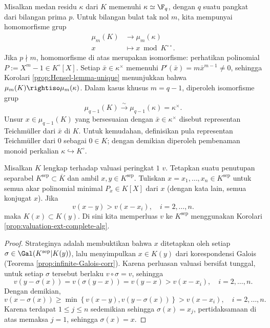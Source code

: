 \begin{example}\label{eg:Teichmuller-rep}
	Misalkan medan residu $\kappa$ dari $K$ memenuhi $\kappa \simeq \F_q$, dengan $q$ suatu pangkat dari bilangan prima $p$. Untuk bilangan bulat tak nol $m$, kita mempunyai homomorfisme grup
	\begin{align*}
		\mu_m(K) & \longrightarrow \mu_m(\kappa) \\
		x & \longmapsto x \bmod K^{\circ\circ}.
	\end{align*}
	Jika $p \nmid m$, homomorfisme di atas merupakan isomorfisme: perhatikan polinomial $P := X^m - 1 \in K^\circ[X]$. Setiap $\bar{x} \in \kappa^\times$ memenuhi $P'(\bar{x}) = m\bar{x}^{m-1} \neq 0$, sehingga Korolari \ref{prop:Hensel-lemma-unique} menunjukkan bahwa $\mu_m(K) \rightiso \mu_m(\kappa)$. Dalam kasus khusus $m = q-1$, diperoleh isomorfisme grup
	\[ \mu_{q-1}(K) \stackrel{\sim}{\longrightarrow} \mu_{q-1}(\kappa) = \kappa^\times. \]
	Unsur $x \in \mu_{q-1}(K)$ yang bersesuaian dengan $\bar{x} \in \kappa^\times$ disebut representan Teichmüller dari $\bar{x}$ di $K$. Untuk kemudahan, definisikan pula representan Teichmüller dari $0$ sebagai $0 \in K$; dengan demikian diperoleh pembenaman monoid perkalian $\kappa \hookrightarrow K^\circ$.
\end{example}

\begin{theorem}[M.\ Krasner]\label{prop:Krasner-lemma}
	Misalkan $K$ lengkap terhadap valuasi peringkat $1$ $v$. Tetapkan suatu penutupan separabel $K^\mathrm{sep} \subset \overline{K}$ dan ambil $x, y \in K^\mathrm{sep}$. Tuliskan $x = x_1, \ldots, x_n \in K^\mathrm{sep}$ untuk semua akar polinomial minimal $P_x \in K[X]$ dari $x$ (dengan kata lain, semua konjugat $x$). Jika
	\[ v(x-y) > v(x-x_i), \quad i=2, \ldots, n. \]
	maka $K(x) \subset K(y)$. Di sini kita memperluas $v$ ke $K^\mathrm{sep}$ menggunakan Korolari \ref{prop:valuation-ext-complete-alg}.
\end{theorem}
\begin{proof}
	Strateginya adalah membuktikan bahwa $x$ ditetapkan oleh setiap $\sigma \in \Gal(K^\text{sep}|K(y))$, lalu menyimpulkan $x \in K(y)$ dari korespondensi Galois (Teorema \ref{prop:infinite-Galois-corr}). Karena perluasan valuasi bersifat tunggal, untuk setiap $\sigma$ tersebut berlaku $v \circ \sigma = v$, sehingga
	\[ v(y-\sigma(x)) = v(\sigma(y-x)) = v(y-x) > v(x-x_i), \quad i=2, \ldots, n. \]
	Dengan demikian,
	\[ v(x-\sigma(x)) \geq \min\left\{ v(x-y), v(y-\sigma(x)) \right\}  > v(x-x_i), \quad i=2, \ldots, n. \]
	Karena terdapat $1 \leq j \leq n$ sedemikian sehingga $\sigma(x) = x_j$, pertidaksamaan di atas memaksa $j=1$, sehingga $\sigma(x)=x$.
\end{proof}

